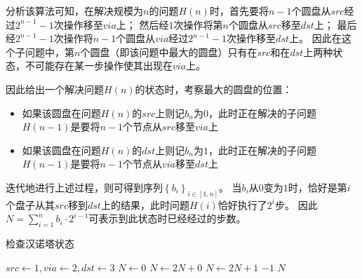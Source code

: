 \documentclass[answers]{exam}
\begin{document}
\begin{questions}
\begin{solution}
\begin{parts}
{            分析该算法可知，在解决规模为$n$的问题$H(n)$时，首先要将$n-1$个圆盘从$src$经过$2^{n-1}-1$次操作移至$via$上；
            然后经$1$次操作将第$n$个圆盘从$src$移至$dst$上；
            最后经$2^{n-1}-1$次操作将$n-1$个圆盘从$via$经过$2^{n-1}-1$次操作移至$dst$上。
            因此在这个子问题中，第$n$个圆盘（即该问题中最大的圆盘）只有在$src$和在$dst$上两种状态，不可能存在某一步操作使其出现在$via$上。

            因此给出一个解决问题$H(n)$的状态时，考察最大的圆盘的位置：
            \begin{itemize}
                \item 如果该圆盘在问题$H(n)$的$src$上则记$b_n$为$0$，此时正在解决的子问题$H(n-1)$是要将$n-1$个节点从$src$移至$via$上
                \item 如果该圆盘在问题$H(n)$的$dst$上则记$b_n$为$1$，此时正在解决的子问题$H(n-1)$是要将$n-1$个节点从$via$移至$dst$上
            \end{itemize}
            迭代地进行上述过程，则可得到序列$\left\{b_i\right\}_{i \in [1, n]}$。
            当$b_i$从$0$变为$1$时，恰好是第$i$个盘子从其$src$移到$dst$上的结果，此时问题$H(i)$恰好执行了$2^i$步。
            因此$N = \sum_{i=1}^n{b_i \cdot 2^{i-1}}$可表示到此状态时已经经过的步数。

            \begin{algorithm}[H]
                \caption{检查汉诺塔状态}
                \begin{algorithmic}[1]
                    \State $src \gets 1, via \gets 2, dst \gets 3$
                    \State $N \gets 0$
                    \State $N \gets 2N + 0$
                    \State {}
                    \State $N \gets 2N + 1$
                    \State {}
                    \Else
                    \State \Return $-1$
                    \EndIf
                    \EndFor
                    \State \Return $N$
                \end{algorithmic}
            \end{algorithm}

            }
        \end{parts}
    \end{solution}


\end{questions}
\end{document}
